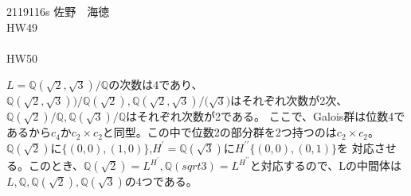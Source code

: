 \documentclass[11pt]{jsarticle}
\begin{document}
2119116s 佐野　海徳\\
HW49\\
\\HW50
\par $L = \mathbb{Q}(\sqrt{2},\sqrt{3})/\mathbb{Q}$の次数は4であり、$\mathbb{Q}(\sqrt{2},\sqrt{3}))/\mathbb{Q}(\sqrt{2}), \mathbb{Q}(\sqrt{2},\sqrt{3})/\mathbb(\sqrt{3})$はそれぞれ次数が2次、
$\mathbb{Q}(\sqrt{2})/\mathbb{Q},\mathbb{Q}(\sqrt{3})/\mathbb{Q}$はそれぞれ次数が2である。
ここで、Galois群は位数4であるから$c_4$か$c_2 \times c_2$と同型。この中で位数2の部分群を2つ持つのは$c_2 \times c_2$。$\mathbb{Q}(\sqrt{2})$に$\{(0,0),(1,0)\}$,$H^{\prime} = \mathbb{Q}(\sqrt{3})$に$H^{\prime\prime}\{(0,0),(0,1)\}$を
対応させる。このとき、$\mathbb{Q}(\sqrt{2}) = L^{H^{\prime}}, \mathbb{Q}(sqrt{3}) = L^{H^{\prime\prime}}$と対応するので、Lの中間体は$L,\mathbb{Q}, \mathbb{Q}(\sqrt{2}), \mathbb{Q}(\sqrt{3})$の4つである。
\end{document}

